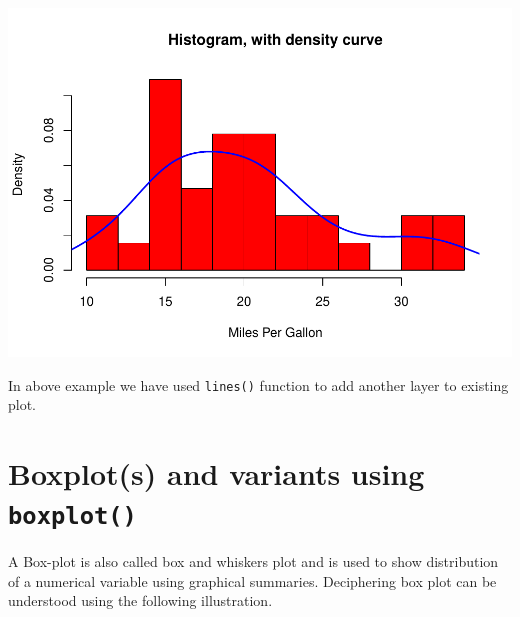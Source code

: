 \documentclass[
]{book}
\begin{document}
\begin{center}\includegraphics[height=0.55\textheight]{DauR_files/figure-latex/p12-1} \end{center}

In above example we have used \texttt{lines()} function to add another layer to existing plot.

\hypertarget{boxplots-and-variants-using-boxplot}{%
\section{\texorpdfstring{Boxplot(s) and variants using \texttt{boxplot()}}{Boxplot(s) and variants using boxplot()}}\label{boxplots-and-variants-using-boxplot}}

A Box-plot is also called box and whiskers plot and is used to show distribution of a numerical variable using graphical summaries. Deciphering box plot can be understood using the following illustration.
\end{document}
